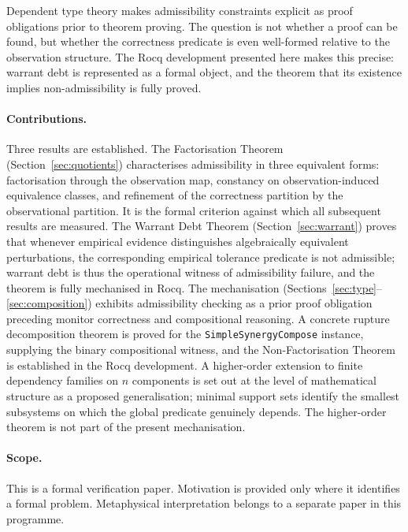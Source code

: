 \documentclass[12pt]{article}
\theoremstyle{plain}
\theoremstyle{definition}
\theoremstyle{remark}
\begin{document}
Dependent type theory makes admissibility constraints explicit as proof
obligations prior to theorem proving.
The question is not whether a proof can be found, but whether the
correctness predicate is even well-formed relative to the observation
structure.
The Rocq development presented here makes this precise: warrant debt
is represented as a formal object, and the theorem that its existence
implies non-admissibility is fully proved.

\paragraph{Contributions.}
Three results are established.
The Factorisation Theorem (Section~\ref{sec:quotients}) characterises
admissibility in three equivalent forms: factorisation through the
observation map, constancy on observation-induced equivalence classes,
and refinement of the correctness partition by the observational
partition.
It is the formal criterion against which all subsequent results are
measured.
The Warrant Debt Theorem (Section~\ref{sec:warrant}) proves that
whenever empirical evidence distinguishes algebraically equivalent
perturbations, the corresponding empirical tolerance predicate is not
admissible; warrant debt is thus the operational witness of
admissibility failure, and the theorem is fully mechanised in Rocq.
The mechanisation (Sections~\ref{sec:type}--\ref{sec:composition})
exhibits admissibility checking as a prior proof obligation preceding
monitor correctness and compositional reasoning. A concrete rupture
decomposition theorem is proved for the \texttt{SimpleSynergyCompose}
instance, supplying the binary compositional witness, and the
Non-Factorisation Theorem is established in the Rocq development. A
higher-order extension to finite dependency families on $n$
components is set out at the level of mathematical structure as a
proposed generalisation; minimal support sets identify the smallest
subsystems on which the global predicate genuinely depends. The
higher-order theorem is not part of the present mechanisation.

\paragraph{Scope.}
This is a formal verification paper.
Motivation is provided only where it identifies a formal problem.
Metaphysical interpretation belongs to a separate paper in this
programme.

\end{document}
